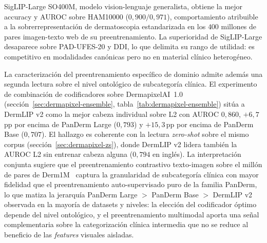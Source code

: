 SigLIP-Large SO400M, modelo vision-lenguaje generalista, obtiene
la mejor accuracy y AUROC sobre HAM10000 ($0{,}900 / 0{,}971$),
comportamiento atribuible a la sobrerrepresentación de dermatoscopia
estandarizada en los $400$ millones de pares imagen-texto web de
su preentrenamiento. La superioridad de SigLIP-Large desaparece
sobre PAD-UFES-20 y DDI, lo que delimita su rango de utilidad: es
competitivo en modalidades canónicas pero no en material clínico
heterogéneo.

La caracterización del preentrenamiento específico de dominio
admite además una segunda lectura sobre el nivel ontológico de
subcategoría clínica. El experimento de combinación de
codificadores sobre DermapixelAI~1.0
(secci\'on~\ref{sec:dermapixel-ensemble},
tabla~\ref{tab:dermapixel-ensemble}) sitúa a DermLIP v2 como la
mejor cabeza individual sobre L2 con AUROC $0{,}860$,
$+6{,}7$\,pp por encima de PanDerm Large ($0{,}793$) y
$+15{,}3$\,pp por encima de PanDerm Base ($0{,}707$).
El hallazgo es coherente con la lectura \emph{zero-shot} sobre el
mismo corpus (secci\'on~\ref{sec:dermapixel-zs}), donde DermLIP v2
lidera también la AUROC L2 sin entrenar cabeza alguna
($0{,}794$ en inglés). La interpretación conjunta sugiere que el
preentrenamiento contrastivo texto-imagen sobre el millón de pares
de Derm1M~\cite{derm1m} captura la granularidad de subcategoría
clínica con mayor fidelidad que el preentrenamiento
auto-supervisado puro de la familia PanDerm, lo que matiza la
jerarquía PanDerm Large $>$ PanDerm Base $>$ DermLIP v2 observada
en la mayoría de datasets y niveles: la elección del codificador
óptimo depende del nivel ontológico, y el preentrenamiento
multimodal aporta una señal complementaria sobre la categorización
clínica intermedia que no se reduce al beneficio de las
\emph{features} visuales aisladas.

